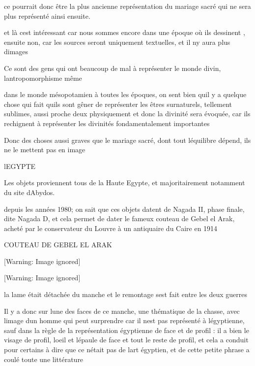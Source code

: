 \documentclass{article}
\begin{document}
ce pourrait donc être la plus ancienne représentation  du mariage sacré
qui ne sera plus représenté ainsi ensuite.

et là c{\textquotesingle}est intéressant car nous sommes encore dans une
époque où ils dessinent , ensuite non, car les sources seront
uniquement textuelles, et il n{\textquotesingle}y aura plus
d{\textquotesingle}images

Ce sont des gens qui ont beaucoup de mal à représenter le monde divin,
l{\textquotesingle}antropomorphisme même 

dans le monde mésopotamien  à toutes les époques,  on sent bien
qu{\textquotesingle}il y a quelque chose qui fait
qu{\textquotesingle}ils sont gêner de représenter les  êtres
surnaturels, tellement sublimes, aussi proche d{\textquotesingle}eux
physiquement et donc la divinité sera évoquée, car ils rechignent à
représenter les divinités fondamentalement importantes

Donc des choses aussi graves que le mariage sacré, dont tout
l{\textquotesingle}équilibre dépend, ils ne le mettent pas en image

 l{\textquotesingle}EGYPTE

Les objets proviennent tous de la Haute Egypte, et majoritairement
notamment du site d{\textquotesingle}Abydos.

depuis les années 1980; on sait que ces objets datent de Nagada II,
phase finale, dite Nagada D, et cela permet de dater le fameux couteau
de Gebel el Arak, acheté par le conservateur du Louvre à un antiquaire
du Caire en 1914

COUTEAU DE GEBEL EL ARAK\ \ 

  [Warning: Image ignored] %
 

  [Warning: Image ignored] %
 

la lame était détachée du manche et le remontage s{\textquotesingle}est
fait entre les deux guerres

Il y a donc sur l{\textquotesingle}une des faces de ce manche, une
thématique de la chasse, avec l{\textquotesingle}image
d{\textquotesingle}un homme qui peut surprendre car il
n{\textquotesingle}est pas représenté à l{\textquotesingle}égyptienne,
sauf dans la règle de la représentation égyptienne de face et de profil
: il a bien le visage de profil, l{\textquotesingle}oeil et
l{\textquotesingle}épaule  de face et tout le reste de profil, et cela
a conduit pour certains à dire que ce n{\textquotesingle}était pas de
l{\textquotesingle}art égyptien, et de cette petite phrase a coulé
toute une littérature
\end{document}
